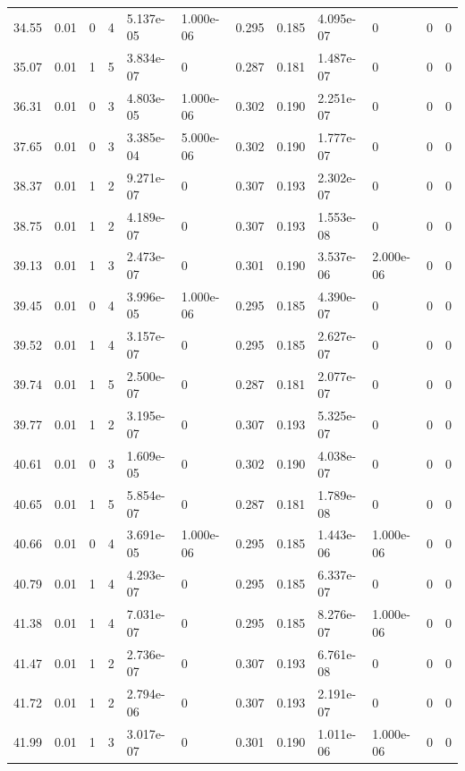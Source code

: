 \documentclass[preview]{standalone}
\begin{document}
{{{\begin{tabular}{L{1.2cm}C{1.2cm} C{0.3cm}C{0.5cm} C{1.4cm}C{1.4cm} C{1.4cm}C{1.4cm} C{1.6cm}C{1.6cm} C{1.6cm}C{1.6cm}}
  34.55  &  0.01  & 0     &  4 &  5.137e-05  & 1.000e-06  &  0.295&   0.185& 4.095e-07 & 0   &  0 & 0  \\ 
  35.07  &  0.01  & 1     &  5 &  3.834e-07  & 0  &  0.287&   0.181& 1.487e-07 & 0   &  0 & 0  \\ 
  36.31  &  0.01  & 0     &  3 &  4.803e-05  & 1.000e-06  &  0.302&   0.190& 2.251e-07 & 0   &  0 & 0  \\ 
  37.65  &  0.01  & 0     &  3 &  3.385e-04  & 5.000e-06  &  0.302&   0.190& 1.777e-07 & 0   &  0 & 0  \\ 
  38.37  &  0.01  & 1     &  2 &  9.271e-07  & 0  &  0.307&   0.193& 2.302e-07 & 0   &  0 & 0  \\ 
  38.75  &  0.01  & 1     &  2 &  4.189e-07  & 0  &  0.307&   0.193& 1.553e-08 & 0   &  0 & 0  \\ 
  39.13  &  0.01  & 1     &  3 &  2.473e-07  & 0  &  0.301&   0.190& 3.537e-06 & 2.000e-06   &  0 & 0  \\ 
  39.45  &  0.01  & 0     &  4 &  3.996e-05  & 1.000e-06  &  0.295&   0.185& 4.390e-07 & 0   &  0 & 0  \\ 
  39.52  &  0.01  & 1     &  4 &  3.157e-07  & 0  &  0.295&   0.185& 2.627e-07 & 0   &  0 & 0  \\ 
  39.74  &  0.01  & 1     &  5 &  2.500e-07  & 0  &  0.287&   0.181& 2.077e-07 & 0   &  0 & 0  \\ 
  39.77  &  0.01  & 1     &  2 &  3.195e-07  & 0  &  0.307&   0.193& 5.325e-07 & 0   &  0 & 0  \\ 
  40.61  &  0.01  & 0     &  3 &  1.609e-05  & 0  &  0.302&   0.190& 4.038e-07 & 0   &  0 & 0  \\ 
  40.65  &  0.01  & 1     &  5 &  5.854e-07  & 0  &  0.287&   0.181& 1.789e-08 & 0   &  0 & 0  \\ 
  40.66  &  0.01  & 0     &  4 &  3.691e-05  & 1.000e-06  &  0.295&   0.185& 1.443e-06 & 1.000e-06   &  0 & 0  \\ 
  40.79  &  0.01  & 1     &  4 &  4.293e-07  & 0  &  0.295&   0.185& 6.337e-07 & 0   &  0 & 0  \\ 
  41.38  &  0.01  & 1     &  4 &  7.031e-07  & 0  &  0.295&   0.185& 8.276e-07 & 1.000e-06   &  0 & 0  \\ 
  41.47  &  0.01  & 1     &  2 &  2.736e-07  & 0  &  0.307&   0.193& 6.761e-08 & 0   &  0 & 0  \\ 
  41.72  &  0.01  & 1     &  2 &  2.794e-06  & 0  &  0.307&   0.193& 2.191e-07 & 0   &  0 & 0  \\ 
  41.99  &  0.01  & 1     &  3 &  3.017e-07  & 0  &  0.301&   0.190& 1.011e-06 & 1.000e-06   &  0 & 0  \\ 

\end{tabular}}}}
\end{document}
